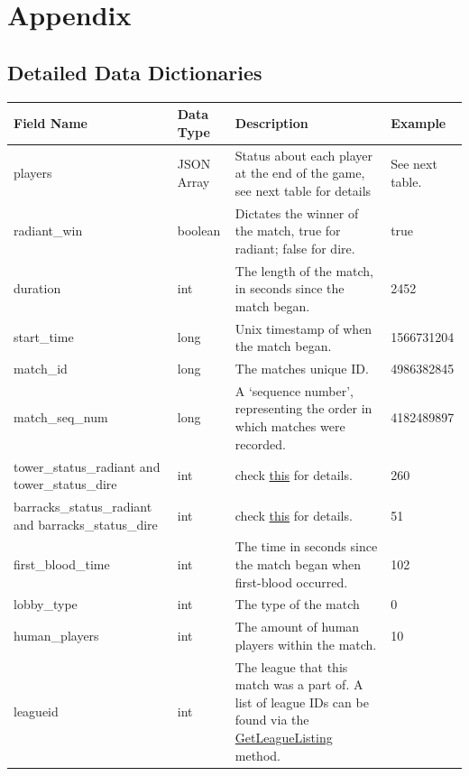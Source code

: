 \documentclass{article}
\begin{document}
\printglossary

\section{Appendix}

\subsection{Detailed Data Dictionaries}

\begin{longtable}{|p{3cm}|p{2cm}|p{5cm}|p{3cm}|}

\hline
\textbf{Field Name} & \textbf{Data Type} & \textbf{Description}  & \textbf{Example}\\
\hline
\endhead

players & JSON Array  & Status about each player at the end of the game, see next table for details & See next table.
\\
\hline
radiant\_win & boolean  & Dictates the winner of the match, true for radiant; false for dire. &true \\
\hline
duration  & int  & The length of the match, in seconds since the match began.  & 2452 \\
\hline
start\_time  & long  & Unix timestamp of when the match began.  & 1566731204 \\
\hline
match\_id  & long  & The matches unique ID.  & 4986382845 \\
\hline
match\_seq\_num  & long  & A `sequence number', representing the order in which matches were recorded.  & 4182489897 \\
\hline
tower\_status\_radiant and tower\_status\_dire  & int  & check \href{https://wiki.teamfortress.com/wiki/WebAPI/GetMatchDetails\#Tower\_Status}{this} for details.  & 260 \\
\hline
barracks\_status\_radiant and barracks\_status\_dire  & int  & check \href{https://wiki.teamfortress.com/wiki/WebAPI/GetMatchDetails\#Barracks\_Status}{this} for details. & 51 \\
\hline
first\_blood\_time  & int  & The time in seconds since the match began when first-blood occurred.  & 102 \\
\hline
lobby\_type  & int  & The type of the match  & 0 \\
\hline
human\_players  & int  & The amount of human players within the match.  & 10 \\
\hline
leagueid  & int  & The league that this match was a part of. A list of league IDs can be found via the \href{https://wiki.teamfortress.com/wiki/WebAPI/GetLeagueListing}{GetLeagueListing} method.

\end{longtable}
\end{document}
